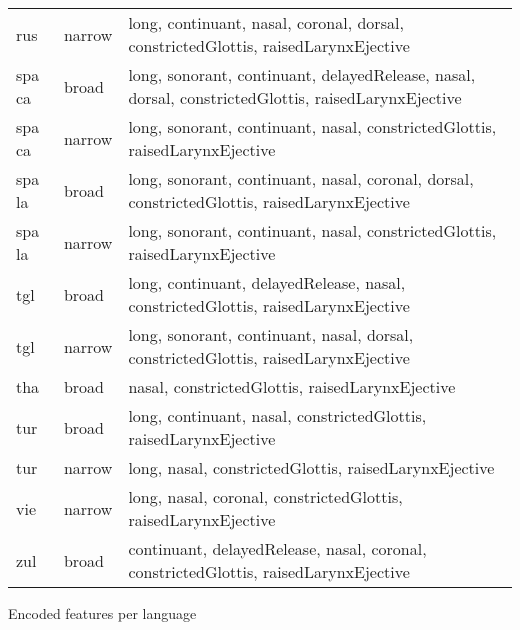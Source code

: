 {\begin{tabularx}{1.1\textwidth}{|llX|}
rus                & narrow        & long, continuant, nasal, coronal, dorsal, constrictedGlottis, raisedLarynxEjective                                                 \\
spa ca             & broad         & long, sonorant, continuant, delayedRelease, nasal, dorsal, constrictedGlottis, raisedLarynxEjective                                \\
spa ca             & narrow        & long, sonorant, continuant, nasal, constrictedGlottis, raisedLarynxEjective                                                        \\
spa la             & broad         & long, sonorant, continuant, nasal, coronal, dorsal, constrictedGlottis, raisedLarynxEjective                                       \\
spa la             & narrow        & long, sonorant, continuant, nasal, constrictedGlottis, raisedLarynxEjective                                                        \\
tgl                & broad         & long, continuant, delayedRelease, nasal, constrictedGlottis, raisedLarynxEjective                                                  \\
tgl                & narrow        & long, sonorant, continuant, nasal, dorsal, constrictedGlottis, raisedLarynxEjective                                                \\
tha                & broad         & nasal, constrictedGlottis, raisedLarynxEjective                                                                                    \\
tur                & broad         & long, continuant, nasal, constrictedGlottis, raisedLarynxEjective                                                                  \\
tur                & narrow        & long, nasal, constrictedGlottis, raisedLarynxEjective                                                                              \\
vie                & narrow        & long, nasal, coronal, constrictedGlottis, raisedLarynxEjective                                                                     \\
zul                & broad         & continuant, delayedRelease, nasal, coronal, constrictedGlottis, raisedLarynxEjective  \\
\hline                                            
\end{tabularx}
\vspace{-0.2cm}
}{Encoded features per language}


